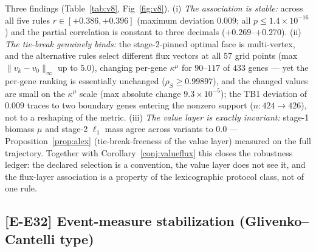 \documentclass[11pt,a4paper]{article}
\theoremstyle{plain}
\theoremstyle{definition}
\theoremstyle{remark}
\newcommand{\kmu}{\kappa^{\mu}}
\begin{document}
Three findings (Table~\ref{tab:v8}, Fig~\ref{fig:v8}). (i) \emph{The association is
stable:} across all five rules $r \in [+0.386, +0.396]$ (maximum
deviation $0.009$; all $p \le 1.4 \times 10^{-16}$) and the partial
correlation is constant to three decimals ($+0.269$--$+0.270$). (ii)
\emph{The tie-break genuinely binds:} the stage-2-pinned optimal face
is multi-vertex, and the alternative rules select different flux
vectors at all $57$ grid points (max $\|v_k - v_0\|_\infty$ up to
$5.0$), changing per-gene $\kmu$ for $90$--$117$ of $433$ genes ---
yet the per-gene ranking is essentially unchanged
($\rho_S \ge 0.99897$), and the changed values are small on the
$\kmu$ scale (max absolute change $9.3 \times 10^{-5}$); the TB1
deviation of $0.009$ traces to two boundary genes entering the
nonzero support ($n: 424 \to 426$), not to a reshaping of the metric.
(iii) \emph{The value layer is exactly invariant:} stage-1 biomass
$\mu$ and stage-2 $\ell_1$ mass agree across variants to $0.0$ ---
Proposition~\ref{prop:alex} (tie-break-freeness of the value layer)
measured on the full trajectory. Together with
Corollary~\ref{conj:valueflux} this closes the robustness ledger: the
declared selection is a convention, the value layer does not see it,
and the flux-layer association is a property of the lexicographic
protocol class, not of one rule.

\subsection{[E-E32] Event-measure stabilization
(Glivenko--Cantelli type)}\label{sec:e32}
\end{document}
